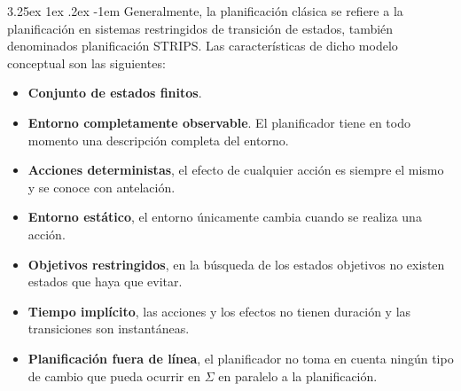 \documentclass{article}
\makeatletter
\renewcommand\paragraph{\@startsection{paragraph}{5}{\z@}%
  {3.25ex \@plus1ex \@minus.2ex}%
  {-1em}%
  {\normalfont\normalsize\bfseries}}
\makeatother
\begin{document}
\paragraph{}
 Generalmente, la planificación clásica se refiere a la planificación en sistemas restringidos de transición de estados\cite{sistemasRestringidos}, también denominados planificación STRIPS. Las características de dicho modelo conceptual son las siguientes:

\begin{itemize}
    \item \textbf{Conjunto de estados finitos}.
    \item \textbf{Entorno completamente observable}. El planificador tiene en todo momento una descripción completa del entorno.    
    \item \textbf{Acciones deterministas}, el efecto de cualquier acción es siempre el mismo y se conoce con antelación.
    \item \textbf{Entorno estático}, el entorno únicamente cambia cuando se realiza una acción.
    \item \textbf{Objetivos restringidos}, en la búsqueda de los estados objetivos no existen estados que haya que evitar.
    \item \textbf{Tiempo implícito}, las acciones y los efectos no tienen duración y las transiciones son instantáneas.
    \item \textbf{Planificación fuera de línea}, el planificador no toma en cuenta ningún tipo de cambio que pueda ocurrir en $\Sigma$ en paralelo a la planificación.
\end{itemize}
\end{document}

